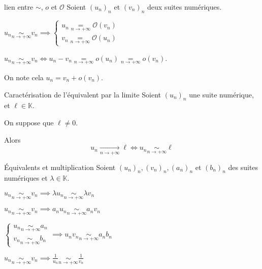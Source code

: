     \begin{prop}{lien entre $\sim$, $o$ et $\mathcal{O}$}{}
        Soient $(u_n)_n$ et $(v_n)_n$ deux suites numériques.
    
        \begin{alors}
            \item $ u_n \underset{n \rightarrow +\infty}{\sim} v_n \implies \left\{ \begin{array}{l}
                u_n \underset{n \rightarrow +\infty}{=} \mathcal{O}(v_n) \\
                v_n \underset{n \rightarrow +\infty}{=} \mathcal{O}(u_n)
            \end{array} \right. $
            \item $u_n \underset{n \rightarrow +\infty}{\sim} v_n \iff u_n - v_n \underset{n \rightarrow +\infty}{=} o(u_n) \underset{n \rightarrow +\infty}{=} o(v_n) $. 
            
            On note cela $u_n = v_n + o(v_n)$.
        \end{alors}
    \end{prop}

    \begin{prop}{Caractérisation de l’équivalent par la limite}{}
        Soient $(u_n)_n$ une suite numérique, et $\ell \in \mathbb{K}$.
    
        On suppose que $\ell \neq 0$.
    
        Alors \[ u_n \underset{n \rightarrow +\infty}{\longrightarrow} \ell \iff u_n \underset{n \rightarrow +\infty}{\sim} \ell \]
    \end{prop}

    \begin{prop}{Équivalents et multiplication}{}
        Soient $(u_n)_n, (v_n)_n, (a_n)_n$ et $(b_n)_n$ des suites numériques et $\lambda \in \mathbb{K}$.
    
        \begin{alors}
            \item $u_n \underset{n \rightarrow +\infty}{\sim} v_n \implies \lambda u_n \underset{n \rightarrow +\infty}{\sim} \lambda v_n$
            \item $ u_n \underset{n \rightarrow +\infty}{\sim} v_n \implies a_n u_n \underset{n \rightarrow +\infty}{\sim} a_n v_n$
            \item $\left\{ \begin{array}{l}
                u_n \underset{n \rightarrow +\infty}{\sim} a_n \\
                v_n \underset{n \rightarrow +\infty}{\sim} b_n
            \end{array} \right. \implies u_n v_n \underset{n \rightarrow +\infty}{\sim} a_n b_n$
            \item $ u_n \underset{n \rightarrow +\infty}{\sim} v_n \implies \frac{1}{u_n} \underset{n \rightarrow +\infty}{\sim} \frac{1}{v_n}$ 
        \end{alors}
    \end{prop}

